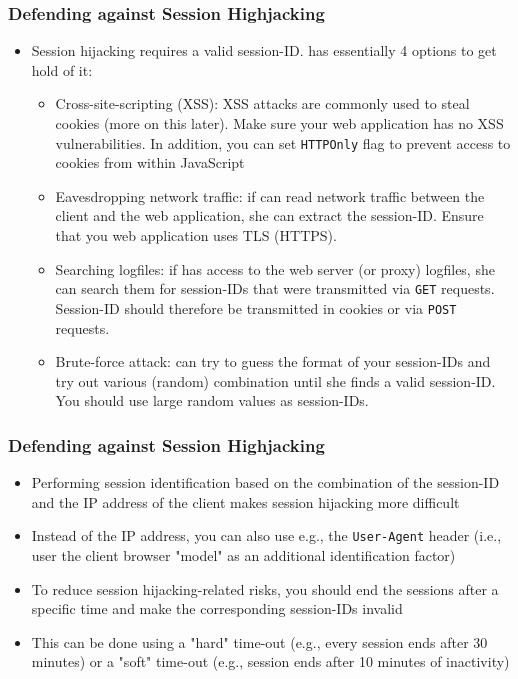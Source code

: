 \begin{frame}
    \frametitle{Defending against Session Highjacking}
    \begin{itemize}
        \item Session hijacking requires a valid session-ID. \Attacker has essentially 4 options to get hold of it:
        \begin{itemize}
            \item Cross-site-scripting (XSS): XSS attacks are commonly used to steal cookies (more on this later). Make sure your web application has no XSS vulnerabilities. In addition, you can set \texttt{HTTPOnly} flag to prevent access to cookies from within JavaScript 
            \item Eavesdropping network traffic: if \attacker can read network traffic between the client and the web application, she can extract the session-ID. Ensure that you web application uses TLS (HTTPS).
            \item Searching logfiles: if \attacker has access to the web server (or proxy) logfiles, she can search them for session-IDs that were transmitted via \texttt{GET} requests. Session-ID should therefore be transmitted in cookies or via \texttt{POST} requests.  
            \item Brute-force attack: \attacker can try to guess the format of your session-IDs and try out various (random) combination until she finds a valid session-ID. You should use large random values as session-IDs.
        \end{itemize}
    \end{itemize}
\end{frame}

\begin{frame}
    \frametitle{Defending against Session Highjacking}
    \begin{itemize}
        \item Performing session identification based on the combination of the session-ID and the IP address of the client makes session hijacking more difficult
        \item Instead of the IP address, you can also use e.g., the \texttt{User-Agent} header (i.e., user the client browser "model" as an additional identification factor)
        \item To reduce session hijacking-related risks, you should end the sessions after a specific time and make the corresponding session-IDs invalid
        \item This can be done using a "hard" time-out (e.g., every session ends after 30 minutes) or a "soft" time-out (e.g., session ends after 10 minutes of inactivity)
    \end{itemize}
\end{frame}


